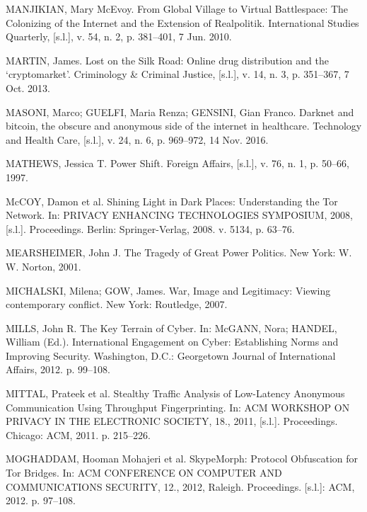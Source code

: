\begin{list}{}{\setlength{\leftmargin}{0pt}\setlength{\itemsep}{6pt}\setlength{\parsep}{0pt}}
\item MANJIKIAN, Mary McEvoy. From Global Village to Virtual Battlespace: The Colonizing of the Internet and the Extension of Realpolitik. International Studies Quarterly, [s.l.], v. 54, n. 2, p. 381--401, 7 Jun. 2010.

\item MARTIN, James. Lost on the Silk Road: Online drug distribution and the `cryptomarket'. Criminology \& Criminal Justice, [s.l.], v. 14, n. 3, p. 351--367, 7 Oct. 2013.

\item MASONI, Marco; GUELFI, Maria Renza; GENSINI, Gian Franco. Darknet and bitcoin, the obscure and anonymous side of the internet in healthcare. Technology and Health Care, [s.l.], v. 24, n. 6, p. 969--972, 14 Nov. 2016.

\item MATHEWS, Jessica T. Power Shift. Foreign Affairs, [s.l.], v. 76, n. 1, p. 50--66, 1997.

\item McCOY, Damon et al. Shining Light in Dark Places: Understanding the Tor Network. In: PRIVACY ENHANCING TECHNOLOGIES SYMPOSIUM, 2008, [s.l.]. Proceedings. Berlin: Springer-Verlag, 2008. v. 5134, p. 63--76.

\item MEARSHEIMER, John J. The Tragedy of Great Power Politics. New York: W. W. Norton, 2001.

\item MICHALSKI, Milena; GOW, James. War, Image and Legitimacy: Viewing contemporary conflict. New York: Routledge, 2007.

\item MILLS, John R. The Key Terrain of Cyber. In: McGANN, Nora; HANDEL, William (Ed.). International Engagement on Cyber: Establishing Norms and Improving Security. Washington, D.C.: Georgetown Journal of International Affairs, 2012. p. 99--108.

\item MITTAL, Prateek et al. Stealthy Traffic Analysis of Low-Latency Anonymous Communication Using Throughput Fingerprinting. In: ACM WORKSHOP ON PRIVACY IN THE ELECTRONIC SOCIETY, 18., 2011, [s.l.]. Proceedings. Chicago: ACM, 2011. p. 215--226.

\item MOGHADDAM, Hooman Mohajeri et al. SkypeMorph: Protocol Obfuscation for Tor Bridges. In: ACM CONFERENCE ON COMPUTER AND COMMUNICATIONS SECURITY, 12., 2012, Raleigh. Proceedings. [s.l.]: ACM, 2012. p. 97--108.


\end{list}

